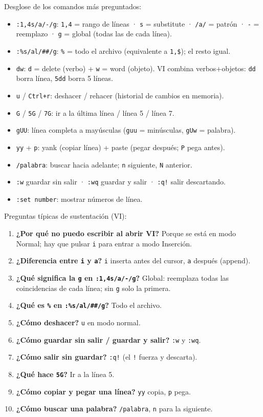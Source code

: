 Desglose de los comandos más preguntados:
\begin{itemize}
  \item \texttt{:1,4s/a/-/g}: \texttt{1,4} = rango de líneas · \texttt{s} = substitute · \texttt{/a/} = patrón · \texttt{-} = reemplazo · \texttt{g} = global (todas las de cada línea).
  \item \texttt{:\%s/al/\#\#/g}: \texttt{\%} = todo el archivo (equivalente a \texttt{1,\$}); el resto igual.
  \item \texttt{dw}: \texttt{d} = delete (verbo) + \texttt{w} = word (objeto). VI combina verbos+objetos: \texttt{dd} borra línea, \texttt{5dd} borra 5 líneas.
  \item \texttt{u} / \texttt{Ctrl+r}: deshacer / rehacer (historial de cambios en memoria).
  \item \texttt{G} / \texttt{5G} / \texttt{7G}: ir a la última línea / línea 5 / línea 7.
  \item \texttt{gUU}: línea completa a mayúsculas (\texttt{guu} = minúsculas, \texttt{gUw} = palabra).
  \item \texttt{yy} + \texttt{p}: yank (copiar línea) + paste (pegar después; \texttt{P} pega antes).
  \item \texttt{/palabra}: buscar hacia adelante; \texttt{n} siguiente, \texttt{N} anterior.
  \item \texttt{:w} guardar sin salir · \texttt{:wq} guardar y salir · \texttt{:q!} salir descartando.
  \item \texttt{:set number}: mostrar números de línea.
\end{itemize}

Preguntas típicas de sustentación (VI):
\begin{enumerate}
  \item \textbf{¿Por qué no puedo escribir al abrir VI?} Porque se está en modo Normal; hay que pulsar \texttt{i} para entrar a modo Inserción.
  \item \textbf{¿Diferencia entre \texttt{i} y \texttt{a}?} \texttt{i} inserta antes del cursor, \texttt{a} después (append).
  \item \textbf{¿Qué significa la \texttt{g} en \texttt{:1,4s/a/-/g}?} Global: reemplaza todas las coincidencias de cada línea; sin \texttt{g} solo la primera.
  \item \textbf{¿Qué es \texttt{\%} en \texttt{:\%s/al/\#\#/g}?} Todo el archivo.
  \item \textbf{¿Cómo deshacer?} \texttt{u} en modo normal.
  \item \textbf{¿Cómo guardar sin salir / guardar y salir?} \texttt{:w} y \texttt{:wq}.
  \item \textbf{¿Cómo salir sin guardar?} \texttt{:q!} (el \texttt{!} fuerza y descarta).
  \item \textbf{¿Qué hace \texttt{5G}?} Ir a la línea 5.
  \item \textbf{¿Cómo copiar y pegar una línea?} \texttt{yy} copia, \texttt{p} pega.
  \item \textbf{¿Cómo buscar una palabra?} \texttt{/palabra}, \texttt{n} para la siguiente.
\end{enumerate}

